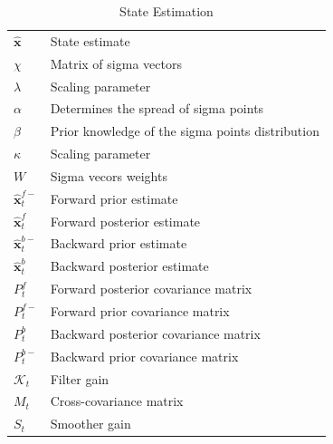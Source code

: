 \documentclass[10pt]{article}
\begin{document}
\begin{table}[h!]\footnotesize
    \begin{tabular}{ll}
        $\hat{\mathbf{x}}$ & State estimate \\
	$\chi$ & Matrix of sigma vectors \\
	$\lambda$& Scaling parameter\\
	$\alpha$& Determines the spread of sigma points\\
	$\beta$& Prior knowledge of the sigma points distribution\\
	$\kappa$& Scaling parameter\\
	$W$& Sigma vecors weights\\
    	$\hat{\mathbf{x}}_t^{f-}$ & Forward prior estimate \\
    	$\hat{\mathbf{x}}_t^f$ & Forward posterior estimate \\
    	$\hat{\mathbf{x}}_t^{b-}$ & Backward prior estimate \\
    	$\hat{\mathbf{x}}_t^{b}$ & Backward posterior estimate \\
    	$P^f_t$ & Forward posterior covariance matrix \\
    	$P^{f-}_t$ & Forward prior covariance matrix \\
    	$P^b_t$ & Backward posterior covariance matrix \\
    	$P^{b-}_t$ & Backward prior covariance matrix \\
	$\mathcal K_{t} $& Filter gain\\
	$M_t$& Cross-covariance matrix\\
	$S_t$& Smoother gain
    \end{tabular}
    \caption{State Estimation}
\end{table}
\end{document}
